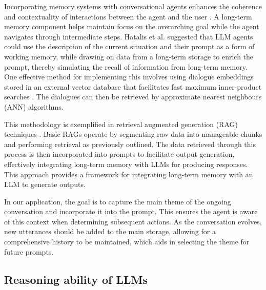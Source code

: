 \documentclass[11pt]{article}
\begin{document}
Incorporating memory systems with conversational agents enhances the coherence and contextuality of interactions between the agent and the user \cite{hatalis_2023_memory_matters}. A long-term memory component helps maintain focus on the overarching goal while the agent navigates through intermediate steps. Hatalis et al. \cite{hatalis_2023_memory_matters} suggested that LLM agents could use the description of the current situation and their prompt as a form of working memory, while drawing on data from a long-term storage to enrich the prompt, thereby simulating the recall of information from long-term memory. One effective method for implementing this involves using dialogue embeddings stored in an external vector database that facilitates fast maximum inner-product searches \cite{hatalis_2023_memory_matters}. The dialogues can then be retrieved by approximate nearest neighbours (ANN) algorithms. 

This methodology is exemplified in retrieval augmented generation (RAG) techniques \cite{gao_retrieval_augmented_generation}. Basic RAGs operate by segmenting raw data into manageable chunks and performing retrieval as previously outlined. The data retrieved through this process is then incorporated into prompts to facilitate output generation, effectively integrating long-term memory with LLMs for producing responses. This approach provides a framework for integrating long-term memory with an LLM to generate outputs.

In our application, the goal is to capture the main theme of the ongoing conversation and incorporate it into the prompt. This ensures the agent is aware of this context when determining subsequent actions. As the conversation evolves, new utterances should be added to the main storage, allowing for a comprehensive history to be maintained, which aids in selecting the theme for future prompts.

\subsection{Reasoning ability of LLMs}
\end{document}
